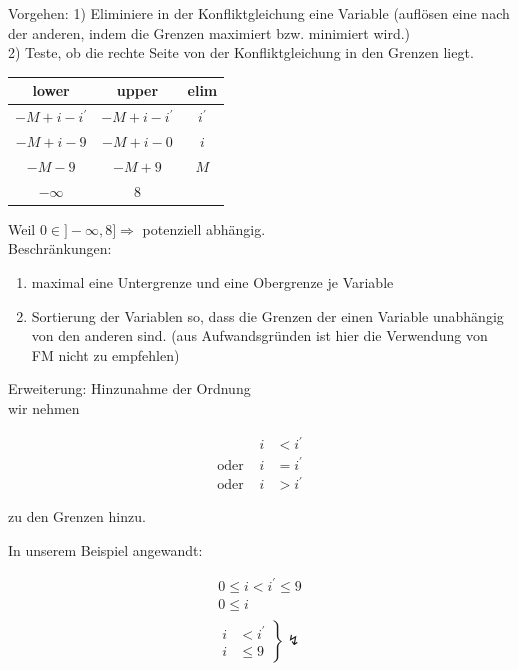 Vorgehen:
1) Eliminiere in der Konfliktgleichung eine Variable (auflösen eine nach der anderen, indem die Grenzen maximiert bzw. minimiert wird.)\\
2) Teste, ob die rechte Seite von der Konfliktgleichung in den Grenzen liegt.\\

\begin{tabular}{c|c|c}
lower & upper & elim \\
\hline
\( -M + i - i^\prime \) & \( -M+i-i^\prime\) & \(i^\prime \) \\
\hline
\( -M+ i - 9 \) & \( -M + i -0 \) & \( i \) \\
\hline
\(-M -9 \) & \( -M +9 \) & \( M \) \\
\hline
\( -\infty \) & \(8\) & \\
\end{tabular}

Weil \( 0 \in ] - \infty, 8 ] \Rightarrow \) potenziell abhängig. \\

Beschränkungen: \\
\begin{enumerate}
	\item maximal eine Untergrenze und eine Obergrenze je Variable
	\item Sortierung der Variablen so, dass die Grenzen der einen Variable unabhängig von den anderen sind. (aus Aufwandsgründen ist hier die Verwendung von FM nicht zu empfehlen)
\end{enumerate}

Erweiterung: Hinzunahme der Ordnung \\
wir nehmen

\begin{align*}
\text{ } & i &< i^\prime \\
\text{oder } & i &= i^\prime \\
\text{oder } & i &> i^\prime
\end{align*}

zu den Grenzen hinzu.

In unserem Beispiel angewandt:

\begin{align*}
0 \leq i < i^\prime  \leq 9 \\
0 \leq i \\
\end{align*}
\[
\left.
\begin{array}{cc}
i & < i^\prime \\
i & \leq  9
\end{array}
\right \} \lightning
\]

